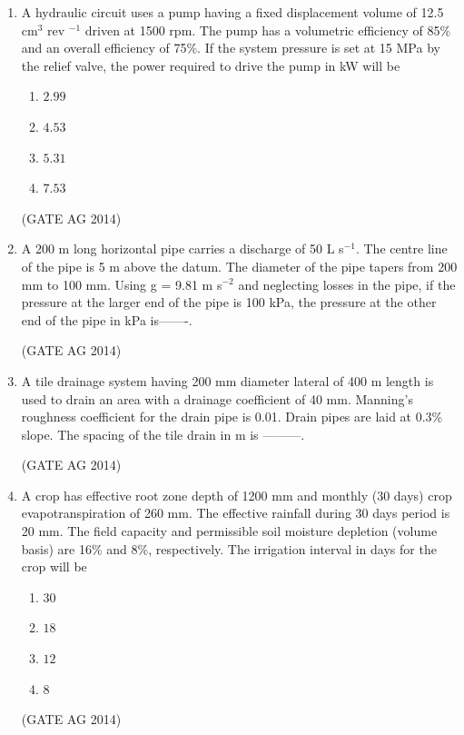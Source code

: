 \documentclass[journal,12pt,onecolumn]{IEEEtran}
\begin{document}
\begin{enumerate}
    \item A hydraulic circuit uses a pump having a fixed displacement volume of 12.5 cm$^3$ rev $^{-1}$ driven at 1500 rpm. The pump has a volumetric efficiency of 85\% and an overall efficiency of 75\%. If the system pressure is set at 15 MPa by the relief valve, the power required to drive the pump in kW will be
    \begin{multicols}{4}
    \begin{enumerate}
        \item $2.99$
        \item $4.53$
        \item $5.31$
        \item $7.53$
    \end{enumerate}
    \end{multicols}
    \hfill(GATE AG 2014)

    \item A 200 m long horizontal pipe carries a discharge of 50 L s$^{-1}$. The centre line of the pipe is 5 m above the datum. The diameter of the pipe tapers from 200 mm to 100 mm. Using g = 9.81 m s$^{-2}$ and neglecting losses in the pipe, if the pressure at the larger end of the pipe is 100 kPa, the pressure at the other end of the pipe in kPa is-------.

    \hfill(GATE AG 2014)

    \item A tile drainage system having 200 mm diameter lateral of 400 m length is used to drain an area with a drainage coefficient of 40 mm. Manning’s roughness coefficient for the drain pipe is 0.01. Drain pipes are laid at 0.3\% slope. The spacing of the tile drain in m is ---------.

    \hfill(GATE AG 2014)

    \item A crop has effective root zone depth of 1200 mm and monthly (30 days) crop evapotranspiration of 260 mm. The effective rainfall during 30 days period is 20 mm. The field capacity and permissible soil moisture depletion (volume basis) are 16\% and 8\%, respectively. The irrigation interval in days for the crop will be
    \begin{multicols}{4}
    \begin{enumerate}
        \item $30$
        \item $18$
        \item $12$
        \item $8$
    \end{enumerate}
    \end{multicols}
    \hfill(GATE AG 2014)


\end{enumerate}
\end{document}
